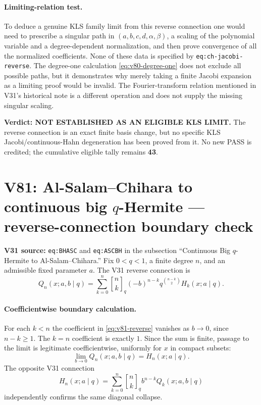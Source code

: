 \documentclass[11pt]{article}
\begin{document}
\paragraph{Limiting-relation test.}
To deduce a genuine KLS family limit from this reverse connection one
would need to prescribe a singular path in $(a,b,c,d,\alpha,\beta)$,
a scaling of the polynomial variable and a degree-dependent
normalization, and then prove convergence of all the normalized
coefficients. None of these data is specified by
\texttt{eq:ch-jacobi-reverse}. The degree-one calculation
\eqref{eq:v80-degree-one} does not exclude all possible paths, but
it demonstrates why merely taking a finite Jacobi expansion as a
limiting proof would be invalid. The Fourier-transform relation
mentioned in V31's historical note is a different operation and does
not supply the missing singular scaling.

\noindent\textbf{Verdict: NOT ESTABLISHED AS AN ELIGIBLE KLS LIMIT.}
The reverse connection is an exact finite basis change, but no
specific KLS Jacobi/continuous-Hahn degeneration has been proved
from it. No new PASS is credited; the cumulative eligible tally
remains \textbf{43}.


\section{V81: Al-Salam--Chihara to continuous big $q$-Hermite --- reverse-connection boundary check}
\noindent\textbf{V31 source:} \texttt{eq:BHASC} and \texttt{eq:ASCBH} in the subsection ``Continuous Big $q$-Hermite to Al-Salam--Chihara.''
Fix $0<q<1$, a finite degree $n$, and an admissible fixed parameter $a$.
The V31 reverse connection is
\begin{equation}\label{eq:v81-reverse}
 Q_n(x;a,b\mid q)=\sum_{k=0}^n {n\brack k}_q
 (-b)^{n-k}q^{\binom{n-k}{2}}H_k(x;a\mid q).
\end{equation}
\paragraph{Coefficientwise boundary calculation.}
For each $k<n$ the coefficient in \eqref{eq:v81-reverse}
vanishes as $b\to0$, since $n-k\ge1$.  The $k=n$ coefficient
is exactly $1$.  Since the sum is finite, passage to the limit is
legitimate coefficientwise, uniformly for $x$ in compact subsets:
\begin{equation}\label{eq:v81-limit}
 \lim_{b\to0}Q_n(x;a,b\mid q)=H_n(x;a\mid q).
\end{equation}
The opposite V31 connection
\[
 H_n(x;a\mid q)=\sum_{k=0}^n {n\brack k}_q
 b^{n-k}Q_k(x;a,b\mid q)
\]
independently confirms the same diagonal collapse.
\end{document}
